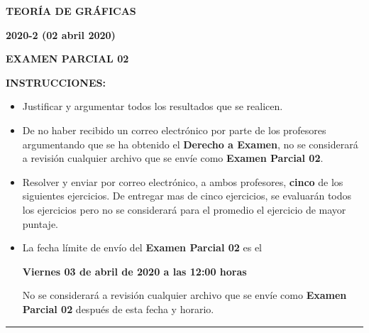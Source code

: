 \documentclass[12pt]{report}
\begin{document}
\begin{center}
\textbf{\LARGE {TEORÍA DE GRÁFICAS}}
\end{center}

\begin{center}
\textbf{{\large 2020-2 (02 abril 2020)}}
\end{center}

\begin{center}
\textbf{{\large EXAMEN PARCIAL 02}}
\end{center}

{\bf INSTRUCCIONES:} 
\begin{itemize}
\item Justificar y argumentar todos los resultados que se realicen.
\item De no haber recibido un correo electrónico por parte de los profesores argumentando que se ha obtenido el \textbf{Derecho a Examen}, no se considerará a revisión cualquier archivo que se envíe como \textbf{Examen Parcial 02}.
\item Resolver y enviar por correo electrónico, a ambos profesores, \textbf{cinco} de los siguientes ejercicios. De entregar mas de cinco ejercicios, se evaluarán todos los ejercicios pero no se considerará para el promedio el ejercicio de mayor puntaje.
\item La fecha límite de envío del \textbf{Examen Parcial 02} es el 
\begin{center}
\textbf{Viernes 03 de abril de 2020 a las 12:00 horas} 
\end{center}
No se considerará a revisión cualquier archivo que se envíe como \textbf{Examen Parcial 02} después de esta fecha y horario.
\end{itemize}

\begin{center}
\rule[0mm]{20cm}{0.2mm}
\end{center}
\end{document}
